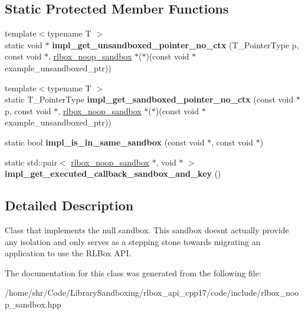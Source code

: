 \subsection*{Static Protected Member Functions}
\begin{DoxyCompactItemize}
\item 
\mbox{\label{classrlbox_1_1rlbox__noop__sandbox_ad8e4d197b5da2ed5028b96ebe03c81dd}} 
{\footnotesize template$<$typename T $>$ }\\static void $\ast$ {\bfseries impl\+\_\+get\+\_\+unsandboxed\+\_\+pointer\+\_\+no\+\_\+ctx} (T\+\_\+\+Pointer\+Type p, const void $\ast$, \hyperlink{classrlbox_1_1rlbox__noop__sandbox}{rlbox\+\_\+noop\+\_\+sandbox} $\ast$($\ast$)(const void $\ast$example\+\_\+unsandboxed\+\_\+ptr))
\item 
\mbox{\label{classrlbox_1_1rlbox__noop__sandbox_a267c49ce62893a37fc138d7a26c30123}} 
{\footnotesize template$<$typename T $>$ }\\static T\+\_\+\+Pointer\+Type {\bfseries impl\+\_\+get\+\_\+sandboxed\+\_\+pointer\+\_\+no\+\_\+ctx} (const void $\ast$p, const void $\ast$, \hyperlink{classrlbox_1_1rlbox__noop__sandbox}{rlbox\+\_\+noop\+\_\+sandbox} $\ast$($\ast$)(const void $\ast$example\+\_\+unsandboxed\+\_\+ptr))
\item 
\mbox{\label{classrlbox_1_1rlbox__noop__sandbox_a5f720e5813f800fe573b028ce363760a}} 
static bool {\bfseries impl\+\_\+is\+\_\+in\+\_\+same\+\_\+sandbox} (const void $\ast$, const void $\ast$)
\item 
\mbox{\label{classrlbox_1_1rlbox__noop__sandbox_a4166590503035668cd74a63755cd1167}} 
static std\+::pair$<$ \hyperlink{classrlbox_1_1rlbox__noop__sandbox}{rlbox\+\_\+noop\+\_\+sandbox} $\ast$, void $\ast$ $>$ {\bfseries impl\+\_\+get\+\_\+executed\+\_\+callback\+\_\+sandbox\+\_\+and\+\_\+key} ()
\end{DoxyCompactItemize}


\subsection{Detailed Description}
Class that implements the null sandbox. This sandbox doesn\textquotesingle{}t actually provide any isolation and only serves as a stepping stone towards migrating an application to use the R\+L\+Box A\+PI. 

The documentation for this class was generated from the following file\+:\begin{DoxyCompactItemize}
\item 
/home/shr/\+Code/\+Library\+Sandboxing/rlbox\+\_\+api\+\_\+cpp17/code/include/rlbox\+\_\+noop\+\_\+sandbox.\+hpp\end{DoxyCompactItemize}
